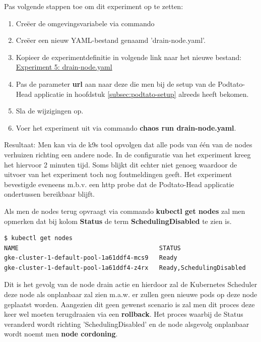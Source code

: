 Pas volgende stappen toe om dit experiment op te zetten: 
\begin{enumerate}
    \item Creëer de omgevingsvariabele via commando 
    \item Creëer een nieuw YAML-bestand genaamd 'drain-node.yaml'.
    \item Kopieer de experimentdefinitie in volgende link naar het nieuwe bestand: \href{https://github.com/KenBruggeman/BP\textunderscore 21-22/blob/master/bachelorproef/docs/chaostoolkit%20experimenten/drain-node.yaml}{Experiment 5: drain-node.yaml}
     \item Pas de parameter {\bf url} aan naar deze die men bij de setup van de Podtato-Head applicatie in hoofdstuk \ref{subsec:podtato-setup} alreeds heeft bekomen.
     \item Sla de wijzigingen op.
     \item Voer het experiment uit via commando {\bf chaos run drain-node.yaml}.
\end{enumerate}

Resultaat: Men kan via de k9s tool opvolgen dat alle pods van één van de nodes verhuizen richting een andere node. In de configuratie van het experiment kreeg het hiervoor 2 minuten tijd. Soms blijkt dit echter niet genoeg waardoor de uitvoer van het experiment toch nog foutmeldingen geeft. \newline Het experiment bevestigde eveneens m.b.v. een http probe dat de Podtato-Head applicatie ondertussen bereikbaar blijft. 

Als men de nodes terug opvraagt via commando {\bf kubectl get nodes} zal men opmerken dat bij kolom {\bf Status} de term {\bf SchedulingDisabled} te zien is.

\begin{lstlisting}
$ kubectl get nodes
NAME                                       STATUS    
gke-cluster-1-default-pool-1a61ddf4-mcs9   Ready                      
gke-cluster-1-default-pool-1a61ddf4-z4rx   Ready,SchedulingDisabled
\end{lstlisting}

Dit is het gevolg van de node drain actie en hierdoor zal de Kubernetes Scheduler deze node als onplanbaar zal zien m.a.w. er zullen geen nieuwe pods op deze node geplaatst worden. Aangezien dit geen gewenst scenario is zal men dit proces deze keer wel moeten terugdraaien via een {\bf rollback}. 
Het proces waarbij de Status veranderd wordt richting 'SchedulingDisabled' en de node alsgevolg onplanbaar wordt noemt men {\bf node cordoning}. \autocite{DeFabia2022}

